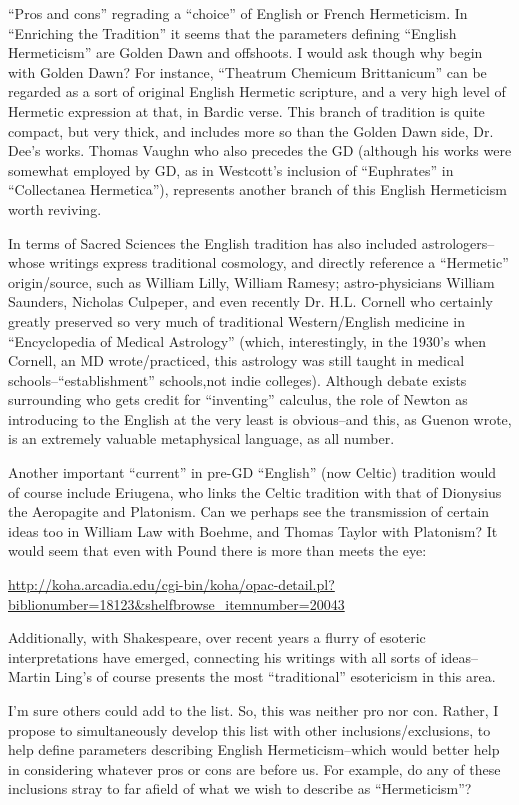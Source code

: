 \begin{footnotesize}
\begin{sffamily}
``Pros and cons'' regrading a ``choice'' of English or French Hermeticism. In ``Enriching the Tradition'' it seems that the parameters defining ``English Hermeticism'' are Golden Dawn and offshoots. I would ask though why begin with Golden Dawn? For instance, ``Theatrum Chemicum Brittanicum'' can be regarded as a sort of original English Hermetic scripture, and a very high level of Hermetic expression at that, in Bardic verse. This branch of tradition is quite compact, but very thick, and includes more so than the Golden Dawn side, Dr. Dee's works. Thomas Vaughn who also precedes the GD (although his works were somewhat employed by GD, as in Westcott's inclusion of ``Euphrates'' in ``Collectanea Hermetica''), represents another branch of this English Hermeticism worth reviving.

In terms of Sacred Sciences the English tradition has also included astrologers--whose writings express traditional cosmology, and directly reference a ``Hermetic'' origin/source, such as William Lilly, William Ramesy; astro-physicians William Saunders, Nicholas Culpeper, and even recently Dr. H.L. Cornell who certainly greatly preserved so very much of traditional Western/English medicine in ``Encyclopedia of Medical Astrology'' (which, interestingly, in the 1930's when Cornell, an MD wrote/practiced, this astrology was still taught in medical schools--``establishment'' schools,not indie colleges). Although debate exists surrounding who gets credit for ``inventing'' calculus, the role of Newton as introducing to the English at the very least is obvious--and this, as Guenon wrote, is an extremely valuable metaphysical language, as all number.

Another important ``current'' in pre-GD ``English'' (now Celtic) tradition would of course include Eriugena, who links the Celtic tradition with that of Dionysius the Aeropagite and Platonism. Can we perhaps see the transmission of certain ideas too in William Law with Boehme, and Thomas Taylor with Platonism? It would seem that even with Pound there is more than meets the eye:

\url{http://koha.arcadia.edu/cgi-bin/koha/opac-detail.pl?biblionumber=18123&shelfbrowse\_itemnumber=20043}

Additionally, with Shakespeare, over recent years a flurry of esoteric interpretations have emerged, connecting his writings with all sorts of ideas--Martin Ling's of course presents the most ``traditional'' esotericism in this area.

I'm sure others could add to the list. So, this was neither pro nor con. Rather, I propose to simultaneously develop this list with other inclusions/exclusions, to help define parameters describing English Hermeticism--which would better help in considering whatever pros or cons are before us. For example, do any of these inclusions stray to far afield of what we wish to describe as ``Hermeticism''?


\end{sffamily}
\end{footnotesize}
